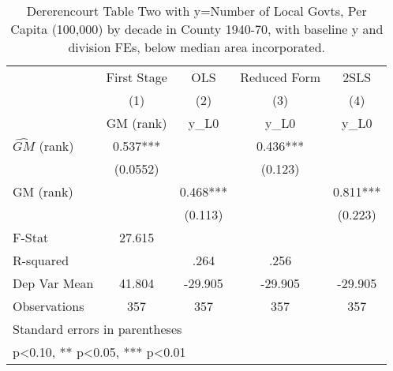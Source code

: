 \begin{table}[htbp]\centering
\def\sym#1{\ifmmode^{#1}\else\(^{#1}\)\fi}
\caption{Dererencourt Table Two with y=Number of Local Govts, Per Capita (100,000) by decade in County 1940-70, with baseline y and division FEs, below median area incorporated.}
\begin{tabular}{l*{4}{c}}
\toprule
                    & First Stage   &         OLS   &Reduced Form   &        2SLS   \\
                    &\multicolumn{1}{c}{(1)}&\multicolumn{1}{c}{(2)}&\multicolumn{1}{c}{(3)}&\multicolumn{1}{c}{(4)}\\
                    &\multicolumn{1}{c}{GM  (rank)}&\multicolumn{1}{c}{y\_L0}&\multicolumn{1}{c}{y\_L0}&\multicolumn{1}{c}{y\_L0}\\
\midrule
$\hat{GM}$ (rank)   &       0.537***&               &       0.436***&               \\
                    &    (0.0552)   &               &     (0.123)   &               \\
\addlinespace
GM  (rank)          &               &       0.468***&               &       0.811***\\
                    &               &     (0.113)   &               &     (0.223)   \\
\midrule
F-Stat              &      27.615   &               &               &               \\
R-squared           &               &        .264   &        .256   &               \\
Dep Var Mean        &      41.804   &     -29.905   &     -29.905   &     -29.905   \\
Observations        &         357   &         357   &         357   &         357   \\
\bottomrule
\multicolumn{5}{l}{\footnotesize Standard errors in parentheses}\\
\multicolumn{5}{l}{\footnotesize * p<0.10, ** p<0.05, *** p<0.01}\\
\end{tabular}
\end{table}
